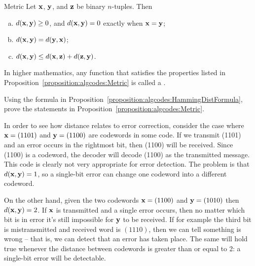 \begin{prop}{Metric}
Let ${\bold x}$, ${\bold y}$, and ${\bold z}$ be binary $n$-tuples.
Then 
\begin{enumerate}[(a)]
\item
$d( {\bold x}, {\bold y}) \geq 0$, and 
$d( {\bold x}, {\bold y}) = 0$ exactly when ${\bold x} = {\bold y}$; 
 
\item
$d( {\bold x}, {\bold y})= d( {\bold y}, {\bold x})$; 
 
\item
$d( {\bold x}, {\bold y}) \leq d( {\bold x}, {\bold z}) + d( {\bold
z}, {\bold y})$. 
 
\end{enumerate}
\end{prop}

In higher mathematics, any function that satisfies the properties listed in Proposition~\ref{proposition:algcodes:Metric} is called a .

 \begin{exercise}{}
 Using the formula in Proposition~\ref{proposition:algcodes:HammingDistFormula}, prove the statements in Proposition~\ref{proposition:algcodes:Metric}.
 \end{exercise}
In order to see how distance relates to error correction, consider the case where ${\bold x} = (1101)$ and ${\bold y} = (1100)$ are
codewords in some code. If we transmit (1101) and an error occurs in
the rightmost bit, then (1100) will be received. Since (1100) is a
codeword, the decoder will decode (1100) as the transmitted message.
This code is clearly not very appropriate for error detection. The
problem is that $d({\bold x}, {\bold y}) = 1$, so a single-bit error can change one codeword into a different codeword. 

On the other hand, given the two codewords ${\bold x} = (1100)$
and ${\bold y} = (1010)$ then $d({\bold x}, {\bold y})
= 2$. If ${\bold x}$ is transmitted and a single error occurs, then no matter which bit is in error it's still impossible for 
${\bold y}$ to be received. If for example the third bit is mistransmitted and received word is $(1110)$, then we can tell something is wrong -- that is, we can detect that an error has taken place. The same will hold true whenever the distance between codewords is greater than or equal to 2: a single-bit error will be detectable.

